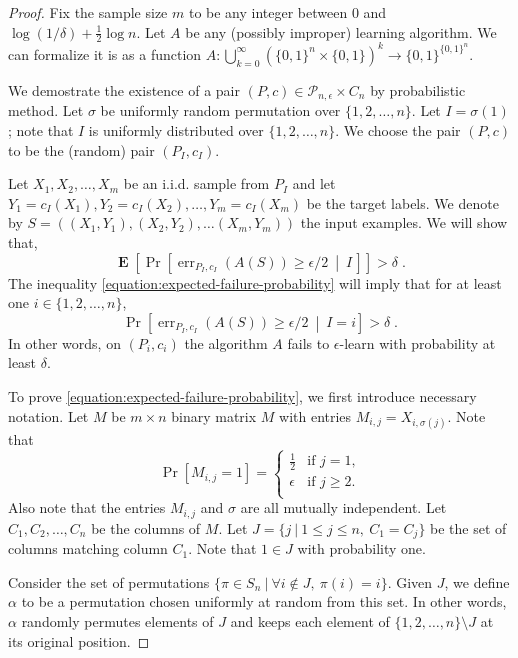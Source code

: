 \documentclass[12pt]{article}
\renewcommand{\P}{\mathcal{P}}
\DeclareMathOperator{\err}{err}
\DeclareMathOperator{\Exp}{\mathbf{E}}
\begin{document}
\begin{proof}
Fix the sample size $m$ to be any integer between $0$ and $\log(1/\delta) + \frac{1}{2} \log n$.
Let $A$ be any (possibly improper) learning algorithm. We can formalize
it is as a function $A:\bigcup_{k=0}^\infty (\{0,1\}^n \times \{0,1\})^k \to
\{0,1\}^{\{0,1\}^n}$.

We demostrate the existence of a pair $(P,c) \in \P_{n,\epsilon} \times C_n$ by
probabilistic method. Let $\sigma$ be uniformly random permutation over
$\{1,2,\dots,n\}$. Let $I = \sigma(1)$; note that $I$ is uniformly distributed
over $\{1,2,\dots,n\}$. We choose the pair $(P,c)$ to be the (random) pair
$(P_I,c_I)$.

Let $X_1, X_2, \dots, X_m$ be an i.i.d. sample from $P_I$ and
let $Y_1 = c_I(X_1), Y_2 = c_I(X_2), \dots, Y_m = c_I(X_m)$ be the target labels.
We denote by $S = ((X_1, Y_1), (X_2, Y_2), \dots (X_m, Y_m))$ the input examples.
We will show that,
\begin{equation}
\label{equation:expected-failure-probability}
\Exp \left[ \Pr \left[\err_{P_I,c_I}(A(S)) \ge \epsilon/2 \ \middle| \ I \, \right] \right] > \delta \; .
\end{equation}
The inequality \eqref{equation:expected-failure-probability} will imply that for at least one $i \in \{1,2,\dots,n\}$,
$$
\Pr \left[\err_{P_I,c_I}(A(S)) \ge \epsilon/2 \ \middle| \ I = i \right] > \delta \; .
$$
In other words, on $(P_i, c_i)$ the algorithm $A$ fails to
$\epsilon$-learn with probability at least $\delta$.

To prove \eqref{equation:expected-failure-probability}, we first introduce
necessary notation. Let $M$ be $m \times n$ binary matrix $M$ with entries
$M_{i,j} = X_{i,\sigma(j)}$. Note that
$$
\Pr[M_{i,j} = 1] =
\begin{cases}
\frac{1}{2} & \text{if $j = 1$,} \\
\epsilon & \text{if $j \ge 2$.} \\
\end{cases}
$$
Also note that the entries $M_{i,j}$ and $\sigma$ are all mutually independent. Let $C_1, C_2,
\dots, C_n$ be the columns of $M$. Let $J = \{ j ~|~ 1 \le j \le n, \ C_1 = C_j \}$
be the set of columns matching column $C_1$. Note that $1 \in J$ with probability one.

Consider the set of permutations $\{ \pi \in S_n ~|~ \forall i \not \in J, \
\pi(i) = i\}$. Given $J$, we define $\alpha$ to be a permutation chosen
uniformly at random from this set. In other words, $\alpha$ randomly permutes
elements of $J$ and keeps each element of $\{1,2,\dots,n\} \setminus J$ at its
original position.


\end{proof}
\end{document}
